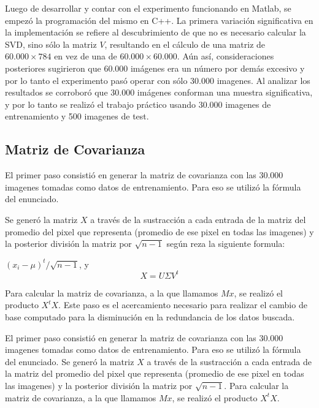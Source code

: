 Luego de desarrollar y contar con el experimento funcionando en Matlab, se empez\'o la programaci\'on
del mismo en C++. La primera variaci\'on significativa en la implementaci\'on se refiere al
descubrimiento de que no es necesario calcular la SVD, sino s\'olo la matriz $V$, resultando
en el c\'alculo de una matriz de $60.000 \times 784$ en vez de una de $60.000 \times 60.000$.
A\'un as\'i, consideraciones posteriores sugirieron que 60.000 im\'agenes era un n\'umero por
dem\'as excesivo y por lo tanto el experimento pas\'o operar con s\'olo 30.000 imagenes.
Al analizar los resultados se corrobor\'o que 30.000 im\'agenes conforman una muestra significativa,
y por lo tanto se realiz\'o el trabajo pr\'actico usando 30.000 imagenes de entrenamiento y 500 imagenes de test.

\subsection{Matriz de Covarianza}

El primer paso consisti\'o en generar la matriz de covarianza con las 30.000 imagenes tomadas como datos
de entrenamiento. Para eso se utiliz\'o la f\'ormula del enunciado.

Se gener\'o la matriz $X$ a trav\'es
de la sustracci\'on a cada entrada de la matriz del promedio del pixel que
representa (promedio de ese pixel en todas las imagenes) y la posterior
divisi\'on la matriz por $\sqrt{n-1}$ seg\'un reza la siguiente formula:

$(x_i - \mu)^{t}/\sqrt{n-1}$, y $$X=U \Sigma V^t$$

Para calcular la matriz de covarianza, a la que llamamos $Mx$, se realiz\'o el
producto $X^tX$. Este paso es el acercamiento necesario para realizar el cambio
de base computado para la disminuci\'on en la redundancia de los datos buscada.

El primer paso consisti\'o en generar la matriz de covarianza con las 30.000 imagenes tomadas como datos
de entrenamiento. Para eso se utiliz\'o la f\'ormula del enunciado. Se gener\'o la matriz $X$ a trav\'es
de la sustracci\'on a cada entrada de la matriz del promedio del pixel que representa (promedio de ese
pixel en todas las imagenes) y la posterior divisi\'on la matriz por $\sqrt{n-1}$. Para calcular la
matriz de covarianza, a la que llamamos $Mx$, se realiz\'o el producto $X^tX$.

